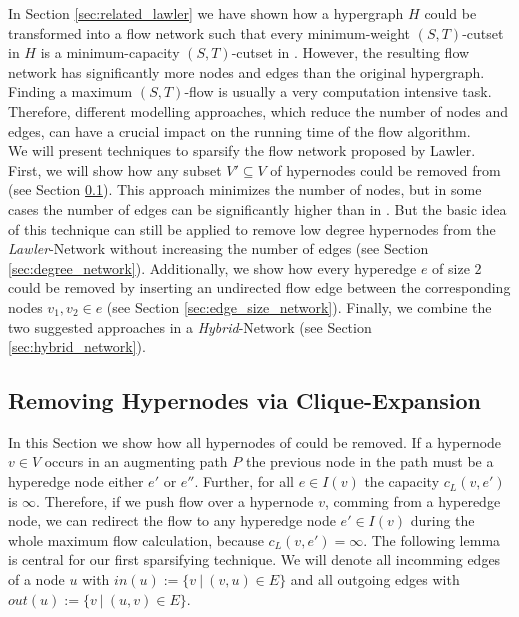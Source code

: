 
In Section \ref{sec:related_lawler} we have shown how a hypergraph $H$ could be transformed into 
a flow network  such that every minimum-weight $(S,T)$-cutset in $H$ is a
minimum-capacity $(S,T)$-cutset in  \cite{lawler1973}. However, the resulting flow
network has significantly more nodes and edges than the original hypergraph. Finding a
maximum $(S,T)$-flow is usually a very computation intensive task. 
Therefore, different modelling approaches, which reduce the number of nodes and edges,
can have a crucial impact on the running time of the flow algorithm. \\
We will present techniques to sparsify the flow network 
proposed by Lawler. First, we will show how any subset $V' \subseteq V$ of hypernodes could be removed 
from  (see Section \ref{sec:heuer_network}). This approach minimizes
the number of nodes, but in some cases the number of edges can be
significantly higher than in . But the basic idea of this technique 
can still be applied to remove low degree hypernodes from the \emph{Lawler}-Network without 
increasing the number of edges (see Section \ref{sec:degree_network}). Additionally, we show
how every hyperedge $e$ of size $2$ could be removed by inserting an undirected flow edge between
the corresponding nodes $v_1,v_2 \in e$  (see Section \ref{sec:edge_size_network}). 
Finally, we combine the two suggested approaches in a \emph{Hybrid}-Network 
(see Section \ref{sec:hybrid_network}).



\subsection{Removing Hypernodes via Clique-Expansion}
\label{sec:heuer_network}

In this Section we show how all hypernodes of  could be removed. If a hypernode $v \in V$
occurs in an augmenting path $P$ the previous node in the path must be a hyperedge node either
$e'$ or $e''$. Further, for all $e \in I(v)$ the capacity $c_L(v,e')$ is $\infty$. Therefore, 
if we push flow over a hypernode $v$, comming from a hyperedge node, we can redirect
the flow to any hyperedge node $e' \in I(v)$ during the whole maximum flow calculation, because 
$c_L(v,e') = \infty$. The following lemma is central for our first sparsifying 
technique. We will denote all incomming edges of a node $u$ with
$in(u) := \{v\ |\ (v,u) \in E\}$ and all outgoing edges with 
$out(u) := \{v\ |\ (u,v) \in E\}$. 

